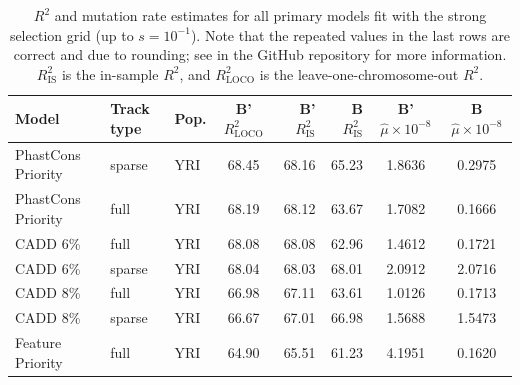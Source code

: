 \documentclass[11pt]{article}
\begin{document}
\begin{table}
    \label{supp:tbl-r2-strongsel}
\centering

\caption{$R^2$ and mutation rate estimates for all primary models fit with the
    strong selection grid (up to $s=10^{-1}$). Note that the repeated values in
    the last rows are correct and due to rounding; see
     in the GitHub repository for more
information. $R_\text{IS}^2$ is the in-sample $R^2$, and $R_\text{LOCO}^2$ is
the leave-one-chromosome-out $R^2$. }

\begin{tabular}{lll|crr|cc}
    \textbf{Model} & \textbf{Track type} & \textbf{Pop.} & \textbf{B' $R_\text{LOCO}^2$} & \textbf{B' $R_\text{IS}^2$} & \textbf{B $R_\text{IS}^2$} & \textbf{B' $\hat{\mu} \times 10^{-8}$} & \textbf{B $\hat{\mu} \times 10^{-8}$} \\[0.5ex] 
\hline
\hline
PhastCons Priority &            sparse &          YRI &                        68.45 &             68.16 &            65.23 &                                 1.8636 &                                0.2975 \\
PhastCons Priority &              full &          YRI &                        68.19 &             68.12 &            63.67 &                                 1.7082 &                                0.1666 \\
          CADD 6\% &              full &          YRI &                        68.08 &             68.08 &            62.96 &                                 1.4612 &                                0.1721 \\
          CADD 6\% &            sparse &          YRI &                        68.04 &             68.03 &            68.01 &                                 2.0912 &                                2.0716 \\
          CADD 8\% &              full &          YRI &                        66.98 &             67.11 &            63.61 &                                 1.0126 &                                0.1713 \\
          CADD 8\% &            sparse &          YRI &                        66.67 &             67.01 &            66.98 &                                 1.5688 &                                1.5473 \\
  Feature Priority &              full &          YRI &                        64.90 &             65.51 &            61.23 &                                 4.1951 &                                0.1620 \\

\end{tabular}
\end{table}
\end{document}
